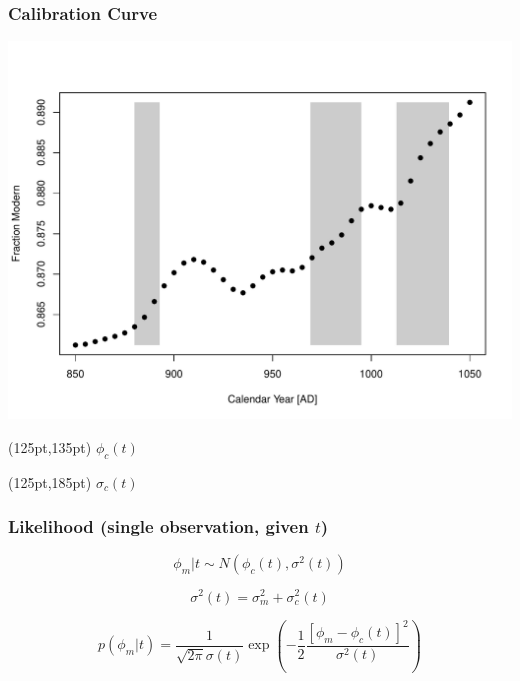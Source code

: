 \documentclass{beamer}
\begin{document}
\begin{frame}[t]
  \frametitle{Calibration Curve}
    \includegraphics[height=.85\textheight]{single_obs_inf_plot2.pdf}
    \begin{textblock*}{100pt}(125pt,135pt)
      \Large $\phi_c(t)$ \normalsize
	\end{textblock*}   
    \begin{textblock*}{100pt}(125pt,185pt)
      \Large $\sigma_c(t)$ \normalsize
	\end{textblock*}   
\end{frame}

\begin{frame}[t]
  \frametitle{Likelihood (single observation, given $t$)}
  \Large
  \begin{equation}
    \phi_m|t \sim N(\phi_c(t),\sigma^2(t))
  \end{equation}
  
  \bigskip
  
  \begin{equation}
    \sigma^2(t) = \sigma^2_m + \sigma^2_c(t)
  \end{equation}
  
  \bigskip
  
  \begin{equation}
    p(\phi_m|t) = \frac{1}{\sqrt{2\pi}\sigma(t)}\exp{(-\frac{1}{2}\frac{[\phi_m-\phi_c(t)]^2}{\sigma^2(t)})}
  \end{equation}
 
  \normalsize
\end{frame}
\end{document}
